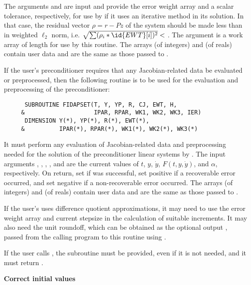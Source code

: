 \begin{Steps}
  The arguments  and  are input and provide the error weight
  array and a scalar tolerance, respectively, for use by  if it uses
  an iterative method in its solution.  In that case, the residual vector
  $\rho = r - Pz$ of the system should be made less than  in weighted
  $\ell_2$ norm, i.e. $\sqrt{\sum(\rho_i * \id{EWT}[i])^2} < $ .
  The argument  is a work array of length  for use by this
  routine.
  The arrays  (of integers) and  (of reals) contain user data
  and are the same as those passed to .

  If the user's preconditioner requires that any Jacobian-related data be evaluated
  or preprocessed, then the following routine is to be used for the evaluation and 
  preprocessing of the preconditioner:
\begin{verbatim}
      SUBROUTINE FIDAPSET(T, Y, YP, R, CJ, EWT, H, 
     &                    IPAR, RPAR, WK1, WK2, WK3, IER)
      DIMENSION Y(*), YP(*), R(*), EWT(*), 
     &          IPAR(*), RPAR(*), WK1(*), WK2(*), WK3(*) 
\end{verbatim}
  It must perform any evaluation of Jacobian-related data and preprocessing needed
  for the solution of the preconditioner linear systems by .
  The input arguments , , , , and  are the
  current values of $t$, $y$, $\dot{y}$, $F(t,y,\dot{y})$, and $\alpha$, respectively.
  On return, set  if  was successful, set 
  positive if a recoverable error occurred, and set  negative if a 
  non-recoverable error occurred.
  The arrays  (of integers) and  (of reals) contain user data
  and are the same as those passed to .

  If the user's  uses difference quotient approximations, it
  may need to use the error weight array  and current stepsize 
  in the calculation of suitable increments.  It may also need the unit
  roundoff, which can be obtained as the optional output ,
  passed from the calling program to this routine using .

  {\warn} If the user calls , the subroutine 
  must be provided, even if it is not needed, and it must return .

\item {\bf Correct initial values}


\end{Steps}
